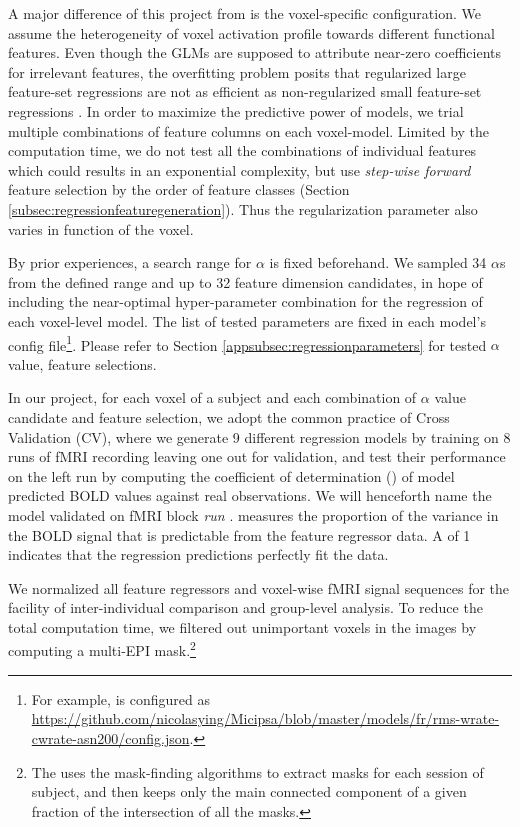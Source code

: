A major difference of this project from \textcite{todorovicAnalysesIRMfLors2018, verdierEncodageActiviteNeuronale2018} is the voxel-specific configuration. We assume the heterogeneity of voxel activation profile towards different functional features. Even though the GLMs are supposed to attribute near-zero coefficients for irrelevant features, the overfitting problem posits that regularized large feature-set regressions are not as efficient as non-regularized small feature-set regressions \parencite{verdierEncodageActiviteNeuronale2018}. In order to maximize the predictive power of models, we trial multiple combinations of feature columns on each voxel-model. Limited by the computation time, we do not test all the combinations of individual features which could results in an exponential complexity, but use \emph{step-wise forward} feature selection by the order of feature classes (Section \ref{subsec:regressionfeaturegeneration}). Thus the regularization parameter also varies in function of the voxel. 

By prior experiences, a search range for \(\alpha\) is fixed beforehand. We sampled 34 \(\alpha\)s from the defined range and up to 32 feature dimension candidates, in hope of including the near-optimal hyper-parameter combination for the regression of each voxel-level model. The list of tested parameters are fixed in each model's config file\footnote{For example,  is configured as \url{https://github.com/nicolasying/Micipsa/blob/master/models/fr/rms-wrate-cwrate-asn200/config.json}.}. Please refer to Section \ref{appsubsec:regressionparameters} for tested \(\alpha\) value, feature selections.

In our project, for each voxel of a subject and each combination of \(\alpha\) value candidate and feature selection, we adopt the common practice of Cross Validation (CV), where we generate 9 different regression models by training on 8 runs of fMRI recording leaving one out for validation, and test their performance on the left run by computing the coefficient of determination () of model predicted BOLD values against real observations. We will henceforth name the model validated on fMRI block  \emph{run} .  measures the proportion of the variance in the BOLD signal that is predictable from the feature regressor data. A  of 1 indicates that the regression predictions perfectly fit the data.

We normalized all feature regressors and voxel-wise fMRI signal sequences for the facility of inter-individual comparison and group-level analysis. To reduce the total computation time, we filtered out unimportant voxels in the images by computing a multi-EPI mask.\footnote{The  uses the mask-finding algorithms to extract masks for each session of subject, and then keeps only the main connected component of a given fraction  of the intersection of all the masks.}

